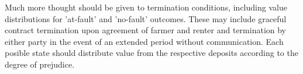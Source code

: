 \documentclass[a4paper,10pt]{article}
\begin{document}
Much more thought should be given to termination conditions, including value distributions for 'at-fault' and 'no-fault' outcomes. These may include graceful contract termination upon agreement of farmer and renter and termination by either party in the event of an extended period without communication. Each posible state should distribute value from the respective deposits according to the degree of prejudice.


\newpage

\begingroup
  \raggedright
  
\endgroup
\end{document}
